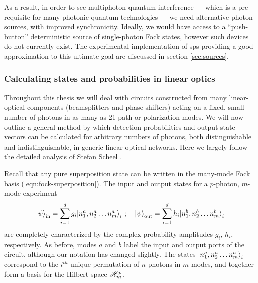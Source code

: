 As a result, in order to see multiphoton quantum interference --- which is a pre-requisite for many photonic quantum technologies --- we need alternative photon sources, with improved synchronicity. Ideally, we would have access to a ``push-button'' deterministic source of single-photon Fock states, however such devices do not currently exist. The experimental implementation of \gls{sps} providing a good approximation to this ultimate goal are discussed in section \ref{sec:sources}.

\subsubsection{Calculating states and probabilities in linear optics}
\label{sec:permanents}
Throughout this thesis we will deal with circuits constructed from many linear-optical components (beamsplitters and phase-shifters) acting on a fixed, small number of photons in as many as 21 path or polarization modes. We will now outline a general method by which detection probabilities and output state vectors can be calculated for arbitrary numbers of photons, both distinguishable and indistinguishable, in generic linear-optical networks. Here we largely follow the detailed analysis of Stefan Scheel \cite{Scheel2004a}.

Recall that any pure superposition state can be written in the many-mode Fock basis (\ref{eqn:fock-superposition}). The input and output states for a $p$-photon, $m$-mode experiment 
\begin{equation}
    \mbox{$ | \psi \rangle $}_{\mathrm{in}} = 
    \sum_{i=1}^d g_i \mbox{$ |  n_{1}^a , n_{2}^a \ldots n_{m}^a \rangle $}_i~;\quad
    \mbox{$ | \psi \rangle $}_{\mathrm{out}} = 
    \sum_{i=1}^d h_i \mbox{$ |  n_{1}^b , n_{2}^b \ldots n_{m}^b \rangle $}_i
    \label{eqn:permanent-input-output}
\end{equation}
are completely characterized by the complex probability amplitudes $g_i$, $h_i$, respectively. 
As before, modes $a$ and $b$ label the input and output ports of the circuit, although our notation has changed slightly.
The states $\mbox{$ |  n_{1}^a , n_{2}^a \ldots n_{m}^a \rangle $}_i$ correspond to the $i^{th}$ unique permutation of $n$ photons in $m$ modes, and together form a basis for the Hilbert space $\mathscr{H}_m^p$. 

